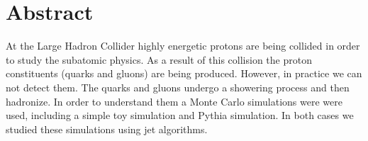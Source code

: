 
\chapter*{Abstract} 
At the Large Hadron Collider highly energetic protons are being collided in order to study the subatomic physics. As a result of this collision the proton constituents (quarks and gluons) are being produced.
However, in practice we can not detect them.
The quarks and gluons undergo a showering process and then hadronize.
In order to understand them a Monte Carlo simulations were were used, including a simple toy simulation and Pythia simulation. In both cases we studied these simulations using jet algorithms.

%
%
%
%




